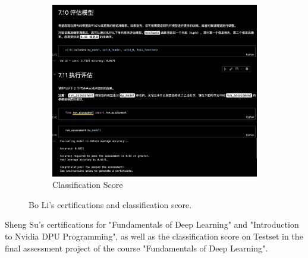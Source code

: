\documentclass[12pt]{article}
\begin{document}
\begin{figure}[H]
	\vspace{1em}
	
	\begin{subfigure}[b]{0.6\textwidth}
		\includegraphics[width=\linewidth]{Bo_Li_Classification_Score.jpg}
		\caption{Classification Score}
	\end{subfigure}
	\caption{Bo Li's certifications and classification score.}
	\label{fig:BL_certification}
\end{figure}

Sheng Su's certifications for "Fundamentals of Deep Learning" and "Introduction to Nvidia DPU Programming", as well as the classification score on Testset in the final assessment project of the course "Fundamentals of Deep Learning".
\end{document}

